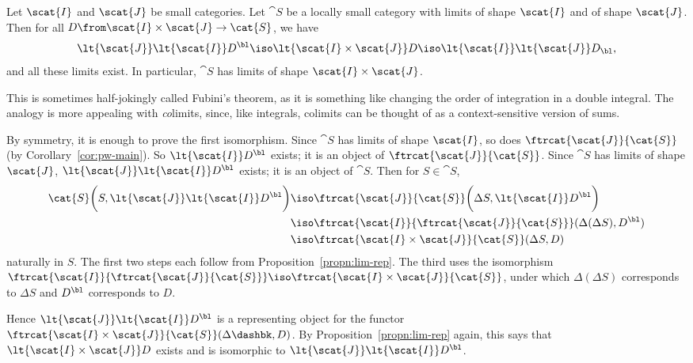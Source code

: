 \begin{propn} 
\label{propn:lims-lims}
%
% 
Let $\scat{I}$ and $\scat{J}$ be small categories.  Let $\cat{S}$ be a
locally small category with limits of shape $\scat{I}$ and of shape
$\scat{J}$.  Then for all $D\from \scat{I} \times \scat{J} \to \cat{S}$, we
have 
\[
\lt{\scat{J}} \lt{\scat{I}} D^\bl
\iso
\lt{\scat{I} \times \scat{J}} D
\iso 
\lt{\scat{I}} \lt{\scat{J}} D_\bl,
\]
and all these limits exist.  In particular, $\cat{S}$ has limits of shape
$\scat{I} \times \scat{J}$.  
\end{propn}
% 
This is sometimes half-jokingly called Fubini's%
%
%
theorem, as it is something like changing the order of integration in a
double integral.  The analogy is more appealing with \emph{co}limits,%
%
%
since, like integrals, colimits can be thought of as a context-sensitive
version of sums.

\begin{pf}
By symmetry, it is enough to prove the first isomorphism.  Since $\cat{S}$
has limits of shape $\scat{I}$, so does $\ftrcat{\scat{J}}{\cat{S}}$ (by
Corollary~\ref{cor:pw-main}).  So $\lt{\scat{I}} D^\bl$ exists; it is an
object of $\ftrcat{\scat{J}}{\cat{S}}$.  Since $\cat{S}$ has limits of
shape $\scat{J}$, $\lt{\scat{J}} \lt{\scat{I}} D^\bl$ exists; it is an
object of $\cat{S}$.  Then for $S \in \cat{S}$,
% 
\begin{align*}
\cat{S}\biggl( S, \lt{\scat{J}} \lt{\scat{I}} D^\bl \biggr)     &
\iso    
\ftrcat{\scat{J}}{\cat{S}}
\biggl( \Delta S, \lt{\scat{I}} D^\bl \biggr)                   \\
        &
\iso   
\ftrcat{\scat{I}}{\ftrcat{\scat{J}}{\cat{S}}} 
(\Delta (\Delta S), D^\bl)                                      \\
        &
\iso   
\ftrcat{\scat{I} \times \scat{J}}{\cat{S}} (\Delta S, D)
\end{align*}
% 
naturally in $S$.  The first two steps each follow from
Proposition~\ref{propn:lim-rep}.  The third uses the isomorphism
$\ftrcat{\scat{I}}{\ftrcat{\scat{J}}{\cat{S}}} \iso \ftrcat{\scat{I} \times
\scat{J}}{\cat{S}}$, under which $\Delta(\Delta S)$ corresponds to $\Delta S$
and $D^\bl$ corresponds to $D$.

Hence $\lt{\scat{J}} \lt{\scat{I}} D^\bl$ is
a representing object for the functor $\ftrcat{\scat{I} \times
\scat{J}}{\cat{S}}(\Delta\dashbk, D)$.  By Proposition~\ref{propn:lim-rep}
again, this says that $\lt{\scat{I} \times \scat{J}} D$ exists and is
isomorphic to $\lt{\scat{J}} \lt{\scat{I}} D^\bl$.
\end{pf}

